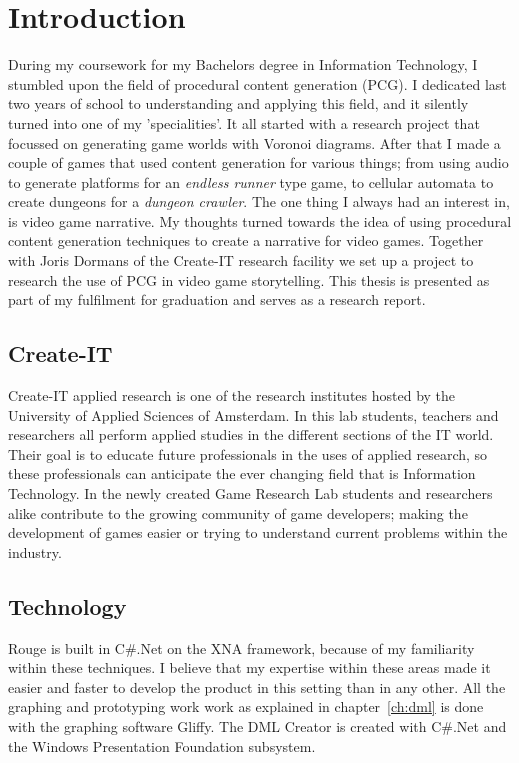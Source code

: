 \chapter{Introduction}
During my coursework for my Bachelors degree in Information Technology, I stumbled upon the field of procedural content generation (PCG). I dedicated last two years of school to understanding and applying this field, and it silently turned into one of my 'specialities'. It all started with a research project that focussed on generating game worlds with Voronoi diagrams. After that I made a couple of games that used content generation for various things; from using audio to generate platforms for an \textit{endless runner} type game, to cellular automata to create dungeons for a \textit{dungeon crawler}.
The one thing I always had an interest in, is video game narrative. My thoughts turned towards the idea of using procedural content generation techniques to create a narrative for video games. Together with Joris Dormans of the Create-IT research facility we set up a project to research the use of PCG in video game storytelling. This thesis is presented as part of my fulfilment for graduation and serves as a research report.

\section{Create-IT}
Create-IT applied research is one of the research institutes hosted by the University of Applied Sciences of Amsterdam. In this lab students, teachers and researchers all perform applied studies in the different sections of the IT world. Their goal is to educate future professionals in the uses of applied research, so these professionals can anticipate the ever changing field that is Information Technology.
In the newly created Game Research Lab students and researchers alike contribute to the growing community of game developers; making the development of games easier or trying to understand current problems within the industry.

\section{Technology}
Rouge is built in C\#.Net on the XNA framework, because of my familiarity within these techniques. I believe that my expertise within these areas made it easier and faster to develop the product in this setting than in any other.
All the graphing and prototyping work work as explained in chapter~\ref{ch:dml} is done with the graphing software Gliffy.
The DML Creator is created with C\#.Net and the Windows Presentation Foundation subsystem.
